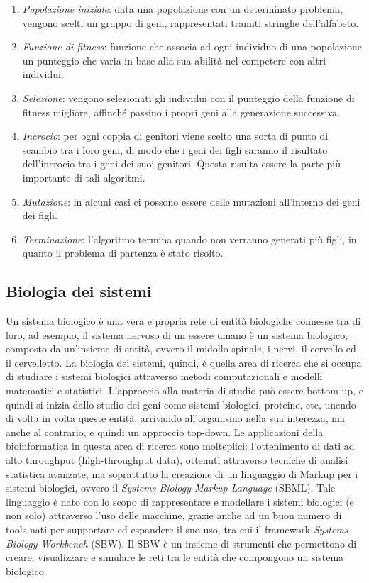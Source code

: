 \begin{enumerate}
	\item \textit{Popolazione iniziale}: data una popolazione con un determinato problema, vengono scelti un gruppo di geni, rappresentati tramiti stringhe dell'alfabeto.
	\item \textit{Funzione di fitness}: funzione che associa ad ogni individuo di una popolazione un punteggio che varia in base alla sua abilità nel competere con altri individui.
	\item \textit{Selezione}: vengono selezionati gli individui con il punteggio della funzione di fitness migliore, affinché passino i propri geni alla generazione successiva.
	\item \textit{Incrocio}: per ogni coppia di genitori viene scelto una sorta di punto di scambio tra i loro geni, di modo che i geni dei figli saranno il risultato dell'incrocio tra i geni dei suoi genitori. Questa risulta essere la parte più importante di tali algoritmi.
	\item \textit{Mutazione}: in alcuni casi ci possono essere delle mutazioni all'interno dei geni dei figli.
	\item \textit{Terminazione}: l'algoritmo termina quando non verranno generati più figli, in quanto il problema di partenza è stato risolto.
\end{enumerate}

\subsection{Biologia dei sistemi}
Un sistema biologico è una vera e propria rete di entità biologiche connesse tra di loro, ad esempio, il sistema nervoso di un essere umano è un sistema biologico, composto da un'insieme di entità, ovvero il midollo spinale, i nervi, il cervello ed il cervelletto.
\newline
La biologia dei sistemi, quindi, è quella area di ricerca che si occupa di studiare i sistemi biologici attraverso metodi computazionali e modelli matematici e statistici. L'approccio alla materia di studio può essere bottom-up, e quindi si inizia dallo studio dei geni come sistemi biologici, proteine, etc, unendo di volta in volta queste entità, arrivando all'organismo nella sua interezza, ma anche al contrario, e quindi un approccio top-down.
\newline
Le applicazioni della bioinformatica in questa area di ricerca sono molteplici: l'ottenimento di dati ad alto throughput (high-throughput data), ottenuti attraverso tecniche di analisi statistica avanzate, ma soprattutto la creazione di un linguaggio di Markup per i sistemi biologici, ovvero il \textit{Systems Biology Markup Language} (SBML)\cite{SBML}. Tale linguaggio è nato con lo scopo di rappresentare e modellare i sistemi biologici (e non solo) attraverso l'uso delle macchine, grazie anche ad un buon numero di tools nati per supportare ed espandere il suo uso, tra cui il framework \textit{Systems Biology Workbench} (SBW)\cite{SBW}. Il SBW è un insieme di strumenti che permettono di creare, visualizzare e simulare le reti tra le entità che compongono un sistema biologico.

